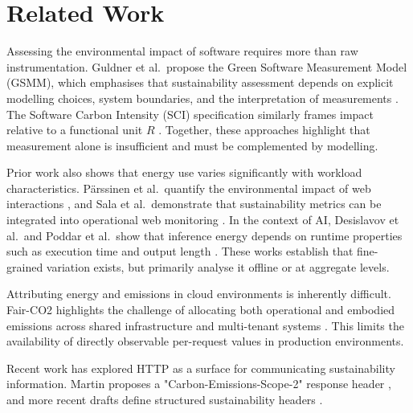 \documentclass[sigconf]{acmart}
\begin{document}
\section{Related Work}
\label{sec:rw}

Assessing the environmental impact of software requires more than raw
instrumentation. Guldner et al.\ propose the Green Software Measurement Model
(GSMM), which emphasises that sustainability assessment depends on explicit
modelling choices, system boundaries, and the interpretation of measurements
\cite{guldner2024gsmm}. The Software Carbon Intensity (SCI) specification
similarly frames impact relative to a functional unit \(R\) \cite{gsf-sci}.
Together, these approaches highlight that measurement alone is insufficient and
must be complemented by modelling.

Prior work also shows that energy use varies significantly with workload
characteristics. Pärssinen et al.\ quantify the environmental impact of web
interactions \cite{parssinen2018onlineadvertising}, and Sala et al.\ demonstrate
that sustainability metrics can be integrated into operational web monitoring
\cite{sala2024greenwebmeter}. In the context of AI, Desislavov et al.\ and
Poddar et al.\ show that inference energy depends on runtime properties such as
execution time and output length \cite{desislavov2023trends,poddar2025towards}.
These works establish that fine-grained variation exists, but primarily analyse
it offline or at aggregate levels.

Attributing energy and emissions in cloud environments is inherently difficult.
Fair-CO2 highlights the challenge of allocating both operational and embodied
emissions across shared infrastructure and multi-tenant systems
\cite{han2025fairco2}. This limits the availability of directly observable
per-request values in production environments.

Recent work has explored HTTP as a surface for communicating sustainability
information. Martin proposes a "Carbon-Emissions-Scope-2" response header
\cite{martin-http-carbon-emissions-scope-2-00}, and more recent drafts define
structured sustainability headers \cite{besleaga-green-sustainability-header-00}.
\end{document}
